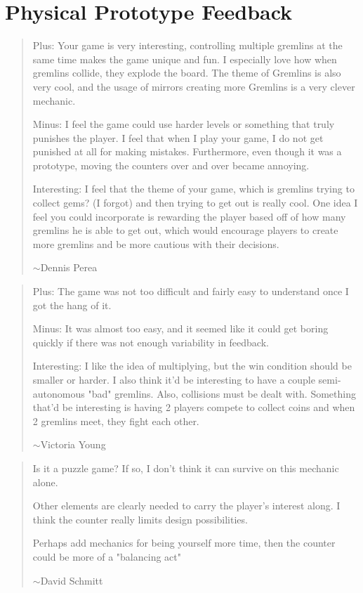 \documentclass{scrreprt}
\newcommand{\newtilde}{$\sim$}
\newcommand\tab[1][1cm]{\hspace*{#1}}
\begin{document}
	\chapter{Physical Prototype Feedback}\label{chp:proto}
		\begin{quote}
			Plus: Your game is very interesting, controlling multiple gremlins at the same time makes the game unique and fun.  I especially love how when gremlins collide, they explode the board.  The theme of Gremlins is also very cool, and the usage of mirrors creating more Gremlins is a very clever mechanic.
			
			Minus: I feel the game could use harder levels or something that truly punishes the player.  I feel that when I play your game, I do not get punished at all for making mistakes. Furthermore, even though it was a prototype, moving the counters over and over became annoying.
			
			Interesting: I feel that the theme of your game, which is gremlins trying to collect gems?  (I forgot) and then trying to get out is really cool.  One idea I feel you could incorporate is rewarding the player based off of how many gremlins he is able to get out, which would encourage players to create more gremlins and be more cautious with their decisions.
			
			\hfill\newtilde Dennis Perea\\
		\end{quote}
		
		\begin{quote}
			Plus: The game was not too difficult and fairly easy to understand once I got the hang of it.
			
			Minus: It was almost too easy, and it seemed like it could get boring quickly if there was not enough variability in feedback.
			
			Interesting: I like the idea of multiplying, but the win condition should be smaller or harder. I also think it'd be interesting to have a couple semi-autonomous "bad" gremlins. Also, collisions must be dealt with. Something that'd be interesting is having 2 players compete to collect coins and when 2 gremlins meet, they fight each other. 
			
			\hfill\newtilde Victoria Young\\
		\end{quote}
		
		\begin{quote}
			Is it a puzzle game? If so, I don't think it can survive on this mechanic alone. 
			
			\tab\tab Other elements are clearly needed to carry the player's interest along. I think the counter really limits design possibilities.
			
			Perhaps add mechanics for being yourself more time, then the counter could be more of a "balancing act"
			
			\hfill\newtilde David Schmitt\\
		\end{quote}
	
\end{document}
